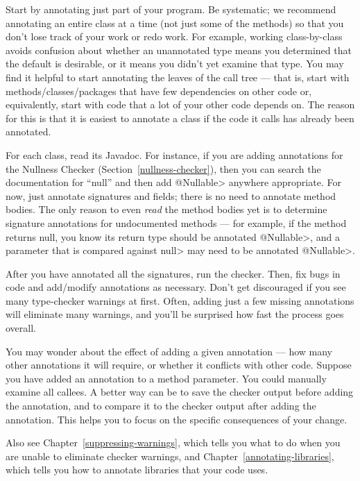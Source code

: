 Start by annotating just part of your program.  Be systematic; we recommend
annotating an entire class at a time (not just some of the methods)
so that you don't lose track of your work or redo work.  For example,
working class-by-class avoids confusion about whether an unannotated type
means you determined that the default is desirable, or it means you didn't
yet examine that type.
You may find it helpful to start annotating the leaves of the call tree ---
that is,
start with methods/classes/packages that have few dependencies on other
code or, equivalently, start with code that a lot of your other code
depends on.  The reason for this is that it is
easiest to annotate a class if the code it calls has already been
annotated.

For each class, read its Javadoc.  For instance, if you are adding
annotations for the Nullness Checker (Section~\ref{nullness-checker}), then
you can search the documentation for ``null'' and then add \<@Nullable>
anywhere appropriate.  For now, just annotate signatures and fields; there is no
need to annotate method bodies.  The only reason to even
\emph{read} the method bodies yet is to determine signature annotations for
undocumented methods ---
for example, if the method returns null, you know its return type should be
annotated \<@Nullable>, and a parameter that is compared against \<null>
may need to be annotated \<@Nullable>.

After you have annotated all the signatures, run the checker.
Then, fix bugs in code and add/modify annotations as necessary.
Don't get discouraged if you see many type-checker warnings at first.
Often, adding just a few missing annotations will eliminate many warnings,
and you'll be surprised how fast the process goes overall.

You may wonder about the effect of adding a given annotation --- how many
other annotations it will require, or whether it conflicts with other code.
Suppose you have added an annotation to a method parameter.  You could
manually examine all callees.  A better way can be to save the checker
output before adding the annotation, and to compare it to the checker
output after adding the annotation.  This helps you to focus on the
specific consequences of your change.

Also see Chapter~\ref{suppressing-warnings}, which tells you what to do when
you are unable to eliminate checker warnings, and
Chapter~\ref{annotating-libraries}, which tells you how to annotate
libraries that your code uses.


